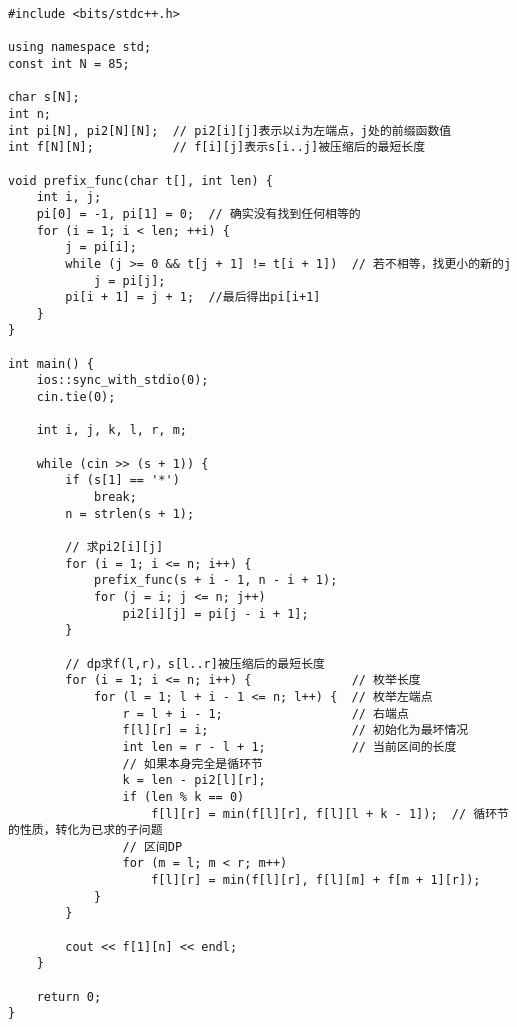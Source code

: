         \begin{lstlisting}
#include <bits/stdc++.h>

using namespace std;
const int N = 85;

char s[N];
int n;
int pi[N], pi2[N][N];  // pi2[i][j]表示以i为左端点，j处的前缀函数值
int f[N][N];           // f[i][j]表示s[i..j]被压缩后的最短长度

void prefix_func(char t[], int len) {
    int i, j;
    pi[0] = -1, pi[1] = 0;  // 确实没有找到任何相等的
    for (i = 1; i < len; ++i) {
        j = pi[i];
        while (j >= 0 && t[j + 1] != t[i + 1])  // 若不相等，找更小的新的j
            j = pi[j];
        pi[i + 1] = j + 1;  //最后得出pi[i+1]
    }
}

int main() {
    ios::sync_with_stdio(0);
    cin.tie(0);

    int i, j, k, l, r, m;

    while (cin >> (s + 1)) {
        if (s[1] == '*')
            break;
        n = strlen(s + 1);

        // 求pi2[i][j]
        for (i = 1; i <= n; i++) {
            prefix_func(s + i - 1, n - i + 1);
            for (j = i; j <= n; j++)
                pi2[i][j] = pi[j - i + 1];
        }

        // dp求f(l,r)，s[l..r]被压缩后的最短长度
        for (i = 1; i <= n; i++) {              // 枚举长度
            for (l = 1; l + i - 1 <= n; l++) {  // 枚举左端点
                r = l + i - 1;                  // 右端点
                f[l][r] = i;                    // 初始化为最坏情况
                int len = r - l + 1;            // 当前区间的长度
                // 如果本身完全是循环节
                k = len - pi2[l][r];
                if (len % k == 0)
                    f[l][r] = min(f[l][r], f[l][l + k - 1]);  // 循环节的性质，转化为已求的子问题
                // 区间DP
                for (m = l; m < r; m++)
                    f[l][r] = min(f[l][r], f[l][m] + f[m + 1][r]);
            }
        }

        cout << f[1][n] << endl;
    }

    return 0;
}
        \end{lstlisting}